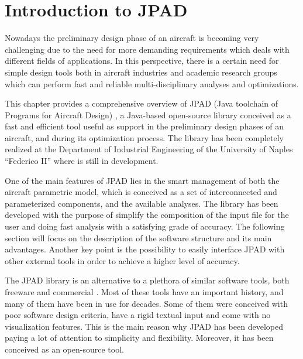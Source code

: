 \chapter{Introduction to JPAD}
\label{ch1}

Nowadays the preliminary design phase of an aircraft is becoming very challenging due to the need for more demanding requirements which deals with different fields of applications. In this perspective, there is a certain need for simple design tools both in aircraft industries and academic research groups which can perform fast and reliable multi-disciplinary analyses and optimizations.

This chapter provides a comprehensive overview of JPAD (Java toolchain of Programs for Aircraft Design) \cite{paper:JPAD}, a Java-based open-source library conceived as a fast and efficient tool useful as support in the preliminary design phases of an aircraft, and during its optimization process. The library has been completely realized at the Department of Industrial Engineering of the University of Naples “Federico II” where is still in development.

One of the main features of JPAD lies in the smart management of both the aircraft parametric model, which is conceived as a set of interconnected and parameterized components, and the available analyses. The library has been developed with the purpose of simplify the composition of the input file for the user and doing fast analysis with a satisfying grade of accuracy. The following section will focus on the description of the software structure and its main advantages. Another key point is the possibility to easily interface JPAD with other external tools in order to achieve a higher level of accuracy.

The JPAD library is an alternative to a plethora of similar software tools, both freeware and commercial \cite{AAA} \cite{Piano5} \cite{RDS}. Most of these tools have an important history, and many of them have been in use for decades. Some of them were conceived with poor software design criteria, have a rigid textual input and come with no visualization features. This is the main reason why JPAD has been developed paying a lot of attention to simplicity and flexibility. Moreover, it has been conceived as an open-source tool.

